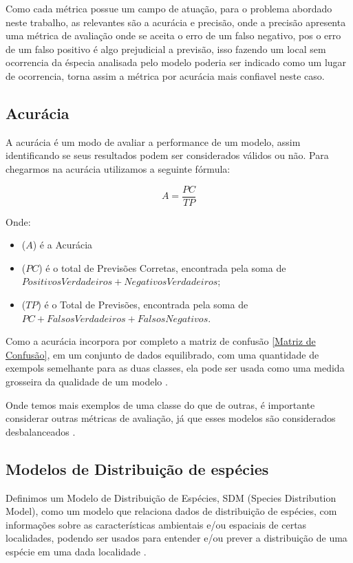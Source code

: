 \documentclass[
	12pt,				%
	openright,			%
	oneside,			%
	a4paper,			%
	english,			%
	brazil				%
	]{abntex2}
\begin{document}
Como cada métrica possue um campo de atuação, para o problema abordado neste trabalho, as relevantes são a acurácia e precisão,
onde a precisão apresenta uma métrica de avaliação onde se aceita o erro de um falso negativo, pos o erro de um falso positivo
é algo prejudicial a previsão, isso fazendo um local sem ocorrencia da éspecia analisada pelo modelo poderia ser indicado como 
um lugar de ocorrencia, torna assim a métrica por acurácia mais confiavel neste caso.

\subsection{Acurácia}

A acurácia é um modo de avaliar a performance de um modelo, assim identificando se seus resultados podem
ser considerados válidos ou não. Para chegarmos na acurácia utilizamos a seguinte fórmula:

\begin{equation}
	\label{conta_acuracia}
	A = \frac{PC}{TP}
\end{equation}

Onde:
\begin{itemize}
	\item ($A$) é a Acurácia
	\item ($PC$) é o total de Previsões Corretas, encontrada pela soma de $Positivos Verdadeiros + Negativos Verdadeiros$;
	\item ($TP$) é o Total de Previsões, encontrada pela soma de $PC + Falsos Verdadeiros + Falsos Negativos$.
\end{itemize}

Como a acurácia incorpora por completo a matriz de confusão \ref{Matriz de Confusão}, em um conjunto de dados equilibrado, 
com uma quantidade de exempols semelhante para as duas classes, ela pode ser usada como uma medida grosseira da qualidade 
de um modelo \cite{acuracia_matriz}.

Onde temos mais exemplos de uma classe do que de outras, é importante considerar outras métricas de avaliação, já que esses
modelos são considerados desbalanceados \cite{acuracia}.

\subsection{Modelos de Distribuição de espécies}

Definimos um Modelo de Distribuição de Espécies, SDM (Species Distribution Model), como um modelo que relaciona dados de 
distribuição de espécies, com informações sobre as características ambientais e/ou espaciais de certas localidades, podendo 
ser usados para entender e/ou prever a distribuição de uma espécie em uma dada localidade \cite{speciesDistributionModels}.
\end{document}
